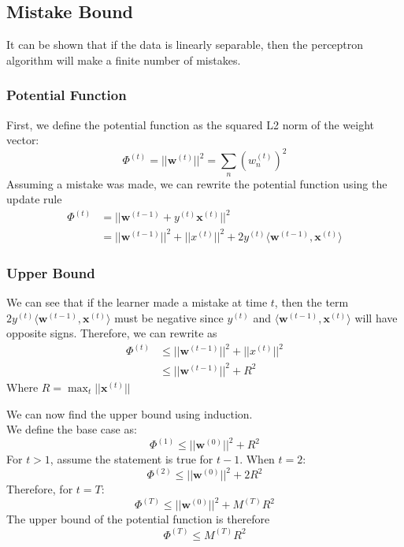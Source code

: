 \documentclass[11pt]{article}
\begin{document}
\subsection{Mistake Bound}
It can be shown that if the data is linearly separable, then the perceptron algorithm will make a finite number of mistakes.\\
\subsubsection{Potential Function}
First, we define the potential function as the squared L2 norm of the weight vector:
$$\Phi^{(t)} = ||\mathbf{w}^{(t)}||^2 = \sum_n (w_n^{(t)})^2$$
Assuming a mistake was made, we can rewrite the potential function using the update rule
\begin{align*}
    \Phi^{(t)} &= ||\mathbf{w}^{(t-1)}+y^{(t)} \mathbf{x}^{(t)}||^2\\
    &=||\mathbf{w}^{(t-1)}||^2 + ||x^{(t)}||^2 + 2y^{(t)}\langle \mathbf{w}^{(t-1)}, \mathbf{x}^{(t)} \rangle
\end{align*}

\subsubsection{Upper Bound}
We can see that if the learner made a mistake at time $t$, then the term $2y^{(t)}\langle \mathbf{w}^{(t-1)}, \mathbf{x}^{(t)}\rangle$ must be negative since $y^{(t)}$ and $\langle \mathbf{w}^{(t-1)}, \mathbf{x}^{(t)}\rangle$ will have opposite signs. Therefore, we can rewrite as
\begin{align*}
    \Phi^{(t)} &\leq ||\mathbf{w}^{(t-1)}||^2 + ||x^{(t)}||^2\\
    &\leq ||\mathbf{w}^{(t-1)}||^2 + R^2
\end{align*}
Where $R = \max_{t} ||\mathbf{x}^{(t)}||$

We can now find the upper bound using induction.\\
We define the base case as:
$$\Phi^{(1)} \leq ||\mathbf{w}^{(0)}||^2 + R^2$$
For $t>1$, assume the statement is true for $t-1$. When $t=2$:
$$\Phi^{(2)} \leq ||\mathbf{w}^{(0)}||^2 + 2R^2$$
Therefore, for $t=T$:
$$\Phi^{(T)} \leq ||\mathbf{w}^{(0)}||^2 + M^{(T)}R^2$$
The upper bound of the potential function is therefore
\begin{equation}
    \boxed{\Phi^{(T)} \leq M^{(T)}R^2}
\end{equation}
\end{document}
